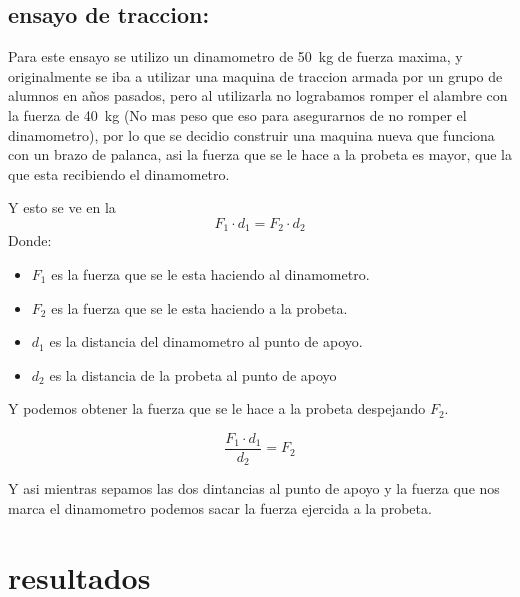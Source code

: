 \documentclass[12pt,a4paper]{article}
\begin{document}
\subsection{ensayo de traccion:}
Para este ensayo se utilizo un dinamometro de \SI{50}{\kilogram} de fuerza maxima, y originalmente se iba a utilizar una maquina de traccion armada por un grupo de alumnos en años pasados, pero al utilizarla no lograbamos romper el alambre con la fuerza de \SI{40}{\kilogram} (No mas peso que eso para asegurarnos de no romper el dinamometro), por lo que se decidio construir una maquina nueva que funciona con un brazo de palanca, asi la fuerza que se le hace a la probeta es mayor, que la que esta recibiendo el dinamometro.

Y esto se ve en la 
\begin{equation}
    F_1\cdot d_1 = F_2\cdot d_2
\end{equation}
Donde:
\begin{itemize}
    \item $F_1$ es la fuerza que se le esta haciendo al dinamometro.
    \item $F_2$ es la fuerza que se le esta haciendo a la probeta.
    \item $d_1$ es la distancia del dinamometro al punto de apoyo.
    \item $d_2$ es la distancia de la probeta al punto de apoyo 
\end{itemize}

Y podemos obtener la fuerza que se le hace a la probeta despejando $F_2$.

\begin{equation}
    \frac{F_1\cdot d_1}{d_2} = F_2
\end{equation}

Y asi mientras sepamos las dos dintancias al punto de apoyo y la fuerza que nos marca el dinamometro podemos sacar la fuerza ejercida a la probeta.


\section{resultados}
\end{document}
